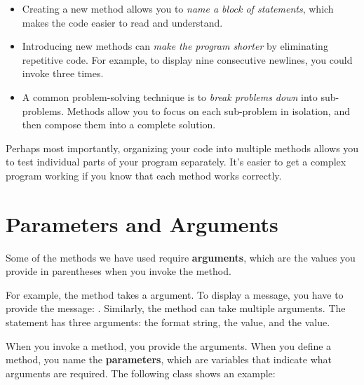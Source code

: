 \begin{itemize}

\item Creating a new method allows you to {\em name a block of statements}, which makes the code easier to read and understand.

\item Introducing new methods can {\em make the program shorter} by eliminating repetitive code.
For example, to display nine consecutive newlines, you could invoke  three times.

\item A common problem-solving technique is to {\em break problems down} into sub-problems.
Methods allow you to focus on each sub-problem in isolation, and then compose them into a complete solution.

\end{itemize}

Perhaps most importantly, organizing your code into multiple methods allows you to test individual parts of your program separately.
It's easier to get a complex program working if you know that each method works correctly.


\section{Parameters and Arguments}

Some of the methods we have used require {\bf arguments}, which are the values you provide in parentheses when you invoke the method.


For example, the  method takes a  argument.
To display a message, you have to provide the message: .
Similarly, the  method can take multiple arguments.
The statement  has three arguments: the format string, the  value, and the  value.



When you invoke a method, you provide the arguments.
When you define a method, you name the {\bf parameters}, which are variables that indicate what arguments are required.
The following class shows an example:

